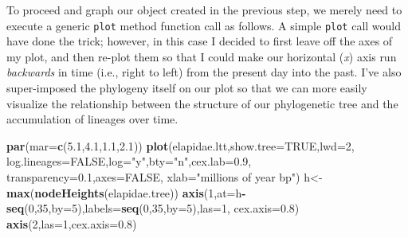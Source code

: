 \documentclass[fleqn,10pt,lineno]{wlpeerj} %
\newenvironment{Shaded}{\begin{snugshade}}{\end{snugshade}}
\newcommand{\AttributeTok}[1]{\textcolor[rgb]{0.13,0.29,0.53}{#1}}
\newcommand{\ConstantTok}[1]{\textcolor[rgb]{0.56,0.35,0.01}{#1}}
\newcommand{\DecValTok}[1]{\textcolor[rgb]{0.00,0.00,0.81}{#1}}
\newcommand{\FloatTok}[1]{\textcolor[rgb]{0.00,0.00,0.81}{#1}}
\newcommand{\FunctionTok}[1]{\textcolor[rgb]{0.13,0.29,0.53}{\textbf{#1}}}
\newcommand{\NormalTok}[1]{#1}
\newcommand{\OtherTok}[1]{\textcolor[rgb]{0.56,0.35,0.01}{#1}}
\newcommand{\SpecialCharTok}[1]{\textcolor[rgb]{0.81,0.36,0.00}{\textbf{#1}}}
\newcommand{\StringTok}[1]{\textcolor[rgb]{0.31,0.60,0.02}{#1}}
\begin{document}
To proceed and graph our object created in the previous step, we merely need to execute a generic \texttt{plot} method function call as follows. A simple \texttt{plot} call would have done the trick; however, in this case I decided to first leave off the axes of my plot, and then re-plot them so that I could make our horizontal (\emph{x}) axis run \emph{backwards} in time (i.e., right to left) from the present day into the past. I've also super-imposed the phylogeny itself on our plot so that we can more easily visualize the relationship between the structure of our phylogenetic tree and the accumulation of lineages over time.

\begin{Shaded}
\begin{Highlighting}[]
\FunctionTok{par}\NormalTok{(}\AttributeTok{mar=}\FunctionTok{c}\NormalTok{(}\FloatTok{5.1}\NormalTok{,}\FloatTok{4.1}\NormalTok{,}\FloatTok{1.1}\NormalTok{,}\FloatTok{2.1}\NormalTok{))}
\FunctionTok{plot}\NormalTok{(elapidae.ltt,}\AttributeTok{show.tree=}\ConstantTok{TRUE}\NormalTok{,}\AttributeTok{lwd=}\DecValTok{2}\NormalTok{,}
  \AttributeTok{log.lineages=}\ConstantTok{FALSE}\NormalTok{,}\AttributeTok{log=}\StringTok{"y"}\NormalTok{,}\AttributeTok{bty=}\StringTok{"n"}\NormalTok{,}\AttributeTok{cex.lab=}\FloatTok{0.9}\NormalTok{,}
  \AttributeTok{transparency=}\FloatTok{0.1}\NormalTok{,}\AttributeTok{axes=}\ConstantTok{FALSE}\NormalTok{,}
  \AttributeTok{xlab=}\StringTok{"millions of year bp"}\NormalTok{)}
\NormalTok{h}\OtherTok{\textless{}{-}}\FunctionTok{max}\NormalTok{(}\FunctionTok{nodeHeights}\NormalTok{(elapidae.tree))}
\FunctionTok{axis}\NormalTok{(}\DecValTok{1}\NormalTok{,}\AttributeTok{at=}\NormalTok{h}\SpecialCharTok{{-}}\FunctionTok{seq}\NormalTok{(}\DecValTok{0}\NormalTok{,}\DecValTok{35}\NormalTok{,}\AttributeTok{by=}\DecValTok{5}\NormalTok{),}\AttributeTok{labels=}\FunctionTok{seq}\NormalTok{(}\DecValTok{0}\NormalTok{,}\DecValTok{35}\NormalTok{,}\AttributeTok{by=}\DecValTok{5}\NormalTok{),}\AttributeTok{las=}\DecValTok{1}\NormalTok{,}
  \AttributeTok{cex.axis=}\FloatTok{0.8}\NormalTok{)}
\FunctionTok{axis}\NormalTok{(}\DecValTok{2}\NormalTok{,}\AttributeTok{las=}\DecValTok{1}\NormalTok{,}\AttributeTok{cex.axis=}\FloatTok{0.8}\NormalTok{)}
\end{Highlighting}
\end{Shaded}
\end{document}
